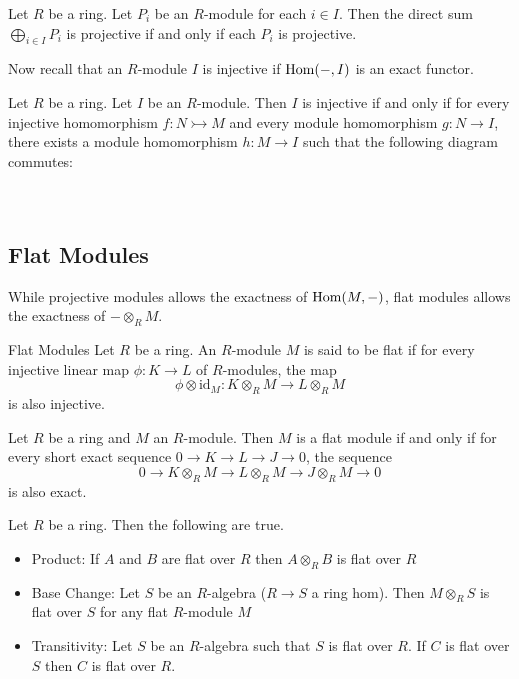 \documentclass[a4paper]{article}
\begin{document}
\begin{prp}{}{} Let $R$ be a ring. Let $P_i$ be an $R$-module for each $i\in I$. Then the direct sum $\bigoplus_{i\in I}P_i$ is projective if and only if each $P_i$ is projective. 
\end{prp}

Now recall that an $R$-module $I$ is injective if $\operatorname{Hom}(-,I)$ is an exact functor. 

\begin{prp}{}{} Let $R$ be a ring. Let $I$ be an $R$-module. Then $I$ is injective if and only if for every injective homomorphism $f:N\rightarrowtail M$ and every module homomorphism $g:N\to I$, there exists a module homomorphism $h:M\to I$ such that the following diagram commutes: \\~\\
 \\
\end{prp}

\subsection{Flat Modules}
While projective modules allows the exactness of $\operatorname{Hom}(M,-)$, flat modules allows the exactness of $-\otimes_RM$. 

\begin{defn}{Flat Modules}{} Let $R$ be a ring. An $R$-module $M$ is said to be flat if for every injective linear map $\phi:K\to L$ of $R$-modules, the map $$\phi\otimes\text{id}_M:K\otimes_RM\to L\otimes_RM$$ is also injective. 
\end{defn}

\begin{prp}{}{} Let $R$ be a ring and $M$ an $R$-module. Then $M$ is a flat module if and only if for every short exact sequence $0\to K\to L\to J\to 0$, the sequence $$0\to K\otimes_RM\to L\otimes_RM\to J\otimes_RM\to 0$$ is also exact. 
\end{prp}

\begin{prp}{}{} Let $R$ be a ring. Then the following are true. 
\begin{itemize}
\item Product: If $A$ and $B$ are flat over $R$ then $A\otimes_R B$ is flat over $R$
\item Base Change: Let $S$ be an $R$-algebra ($R\to S$ a ring hom). Then $M\otimes_RS$ is flat over $S$ for any flat $R$-module $M$
\item Transitivity: Let $S$ be an $R$-algebra such that $S$ is flat over $R$. If $C$ is flat over $S$ then $C$ is flat over $R$. 
\end{itemize}
\end{prp}
\end{document}
